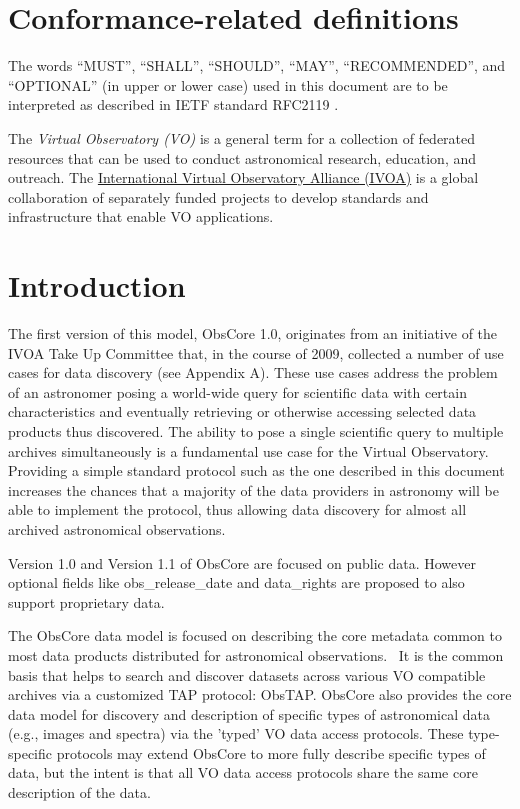 \documentclass[11pt,a4paper]{ivoa}
\begin{document}
\section*{Conformance-related definitions}

The words ``MUST'', ``SHALL'', ``SHOULD'', ``MAY'', ``RECOMMENDED'', and
``OPTIONAL'' (in upper or lower case) used in this document are to be
interpreted as described in IETF standard RFC2119 \citep{std:RFC2119}.

The \emph{Virtual Observatory (VO)} is a
general term for a collection of federated resources that can be used
to conduct astronomical research, education, and outreach.
The \href{https://www.ivoa.net}{International
Virtual Observatory Alliance (IVOA)} is a global
collaboration of separately funded projects to develop standards and
infrastructure that enable VO applications.


\section{Introduction}

The first version of this model, ObsCore 1.0, originates from an initiative of the IVOA Take Up Committee that, in the
course of 2009, collected a number of use cases for data discovery (see Appendix A).  These use cases address the
problem of an astronomer posing a world-wide query for scientific data with certain characteristics and eventually
retrieving or otherwise accessing selected data products thus discovered.  The ability to pose a single scientific
query to multiple archives simultaneously is a fundamental use case for the Virtual Observatory.  Providing a simple
standard protocol such as the one described in this document increases the chances that a majority of the data
providers in astronomy will be able to implement the protocol, thus allowing data discovery for almost all archived
astronomical observations. 

Version 1.0 and Version 1.1 of ObsCore are focused on public data. However optional fields like obs\_release\_date and
data\_rights are proposed to also support proprietary data.

The ObsCore data model is focused on describing the core metadata common to most data products distributed for
astronomical observations.~ It is the common basis that helps to search and discover datasets across various VO
compatible archives via a customized TAP protocol: ObsTAP.  ObsCore also provides the core data model for discovery and
description of specific types of astronomical data (e.g., images and spectra) via the 'typed' VO data access
protocols.  These type-specific protocols may extend ObsCore to more fully describe specific types of data, but the
intent is that all VO data access protocols share the same core description of the data.
\end{document}
